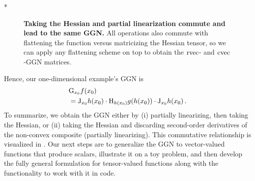 \switchcolumn[1]*
\begin{figure}[!h]
  \centering
  \caption{\textbf{Taking the Hessian and partial linearization commute and lead to the same GGN.}
    All operations also commute with flattening the function versus matricizing the Hessian tensor, so we can apply any flattening scheme on top to obtain the $\operatorname{rvec}$- and $\operatorname{cvec}$-GGN matrices.}\label{fig:commutative-diagram-ggn}
\end{figure}
\switchcolumn[0]

Hence, our one-dimensional example's GGN is
\begin{align*}
  &\mathrm{G}_{x_0} f(x_0)
  \\
  &=\mathrm{J}_{x_0} h(x_0) \cdot \mathrm{H}_{h(x_0)} g(h(x_0)) \cdot \mathrm{J}_{x_0} h(x_0)\,.
\end{align*}
To summarize, we obtain the GGN either by (i) partially linearizing, then taking the Hessian, or (ii) taking the Hessian and discarding second-order derivatives of the non-convex composite (\ie partially linearizing).
This commutative relationship is visualized in .
Our next steps are to generalize the GGN to vector-valued functions that produce scalars, illustrate it on a toy problem, and then develop the fully general formulation for tensor-valued functions along with the functionality to work with it in code.

